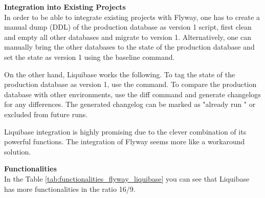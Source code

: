 \textbf{Integration into Existing Projects}\\
In order to be able to integrate existing projects with Flyway, one has to create a manual dump (DDL) of the production database as version 1 script, first clean and empty all other databases and migrate to version 1. Alternatively, one can manually bring the other databases to the state of the production database and set the state as version 1 using the baseline command.

On the other hand, Liquibase works the following. To tag the state of the production database as version 1, use the  command. To compare the production database with other environments, use the diff command and generate changelogs for any differences. 
The generated changelog can be marked as "already run " or excluded from future runs.

Liquibase integration is highly promising due to the clever combination of its powerful functions. The integration of Flyway seems more like a workaround solution.

\textbf{Functionalities}\\
In the Table \ref{tab:functionalities_flyway_liquibase} you can see that Liquibase has more functionalities in the ratio 16/9. 



